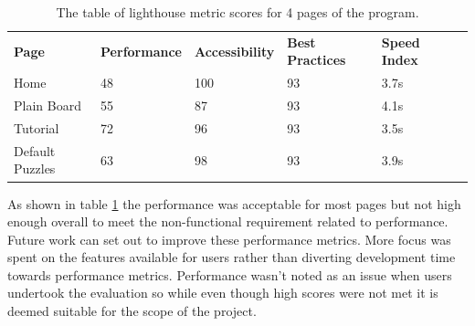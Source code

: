 \documentclass{l4proj}
\begin{document}
\begin{table}[]
    \caption{The table of lighthouse metric scores for 4 pages of the program.}\label{tab:lighthouse}
    \begin{tabular}{llllll}
        \textbf{Page}            & \textbf{Performance} & \textbf{Accessibility} & \textbf{Best Practices} & \textbf{Speed Index} \\
        Home            & 48          & 100           & 93             & 3.7s                            \\
        Plain Board     & 55          & 87            & 93             & 4.1s                            \\
        Tutorial        & 72          & 96            & 93             & 3.5s                            \\
        Default Puzzles & 63          & 98            & 93             & 3.9s                           
    \end{tabular}
\end{table}

As shown in table \ref{tab:lighthouse} the performance was acceptable for most pages but not high enough overall to meet the non-functional requirement related to performance. Future work can set out to improve these performance metrics. More focus was spent on the features available for users rather than diverting development time towards performance metrics. Performance wasn't noted as an issue when users undertook the evaluation so while even though high scores were not met it is deemed suitable for the scope of the project. 

\end{document}
